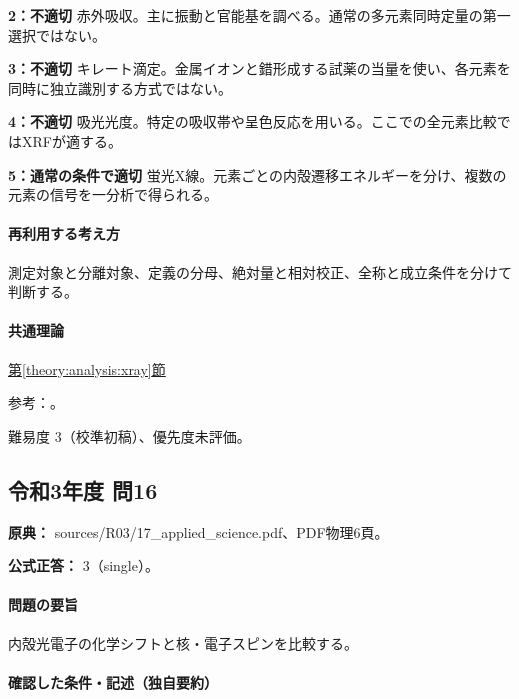 \noindent\textbf{2：不適切} 赤外吸収。主に振動と官能基を調べる。通常の多元素同時定量の第一選択ではない。\par

\noindent\textbf{3：不適切} キレート滴定。金属イオンと錯形成する試薬の当量を使い、各元素を同時に独立識別する方式ではない。\par

\noindent\textbf{4：不適切} 吸光光度。特定の吸収帯や呈色反応を用いる。ここでの全元素比較ではXRFが適する。\par

\noindent\textbf{5：通常の条件で適切} 蛍光X線。元素ごとの内殻遷移エネルギーを分け、複数の元素の信号を一分析で得られる。\par

\paragraph{再利用する考え方} 測定対象と分離対象、定義の分母、絶対量と相対校正、全称と成立条件を分けて判断する。

\paragraph{共通理論} \hyperref[theory:analysis:xray]{第\ref*{theory:analysis:xray}節}

\par 参考：\cite{analysis49_xrf_ref}。

\par 難易度 3（校準初稿）、優先度未評価。

\subsection{令和3年度 問16}
\label{q:r03-reg-applied-16}

\noindent\textbf{原典：} sources/R03/17\_applied\_science.pdf、PDF物理6頁。

\textbf{公式正答：} 3（single）。

\paragraph{問題の要旨} 内殻光電子の化学シフトと核・電子スピンを比較する。

\paragraph{確認した条件・記述（独自要約）}\mbox{}\par

